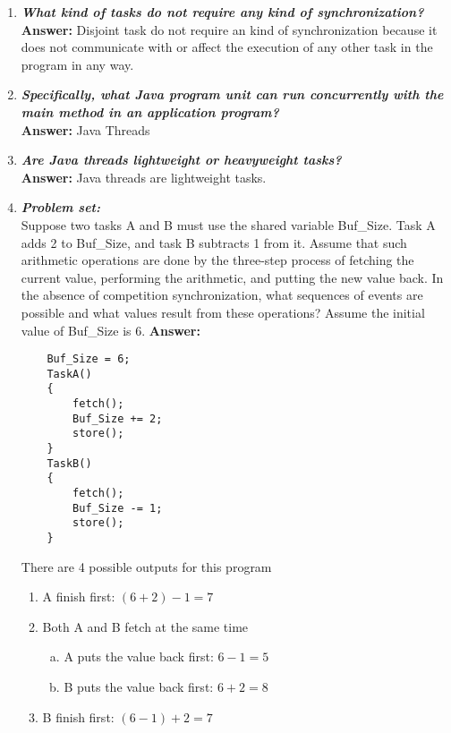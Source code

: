 \documentclass{article}
\begin{document}
\begin{enumerate}[(1)]
\item 
\textbf{\textit{What kind of tasks do not require any kind of synchronization?}}\\
\textbf{Answer: } Disjoint task do not require an kind of synchronization because it does not communicate with or affect the execution of any other task in the program in any way.

\item 
\textbf{\textit{Specifically, what Java program unit can run concurrently with the main method in an application program?}}\\
\textbf{Answer: } Java Threads  

\item 
\textbf{\textit{Are Java threads lightweight or heavyweight tasks?}}\\
\textbf{Answer:} Java threads are lightweight tasks.

\item 
\textbf{\textit{Problem set:}}\\
 Suppose two tasks A and B must use the shared variable Buf\_Size. Task A adds 2 to Buf\_Size, and task B subtracts 1 from it. Assume that such arithmetic operations are done by the three-step process of fetching the current value, performing the arithmetic, and putting the new value back. In the absence of competition synchronization, what sequences of events are possible and what values result from these operations? Assume the initial value of Buf\_Size is 6.
\textbf{Answer: }  
	\begin{lstlisting}
	Buf_Size = 6;
	TaskA()
	{
		fetch();
		Buf_Size += 2;
		store();
	}
	TaskB()
	{
		fetch();
		Buf_Size -= 1;
		store();
	}
	\end{lstlisting}
There are 4 possible outputs for this program
	\begin{enumerate}[(1)]
	\item 
	A finish first: $(6+2)-1 = 7$
	\item 
	Both A and B fetch at the same time
		\begin{enumerate}[(a)]
		\item A puts the value back first: $6-1 = 5$
		\item B puts the value back first: $6+2 = 8$
		\end{enumerate}
	\item 
	B finish first: $(6-1) +2 =7$
	\end{enumerate}
\end{enumerate}
\end{document}
